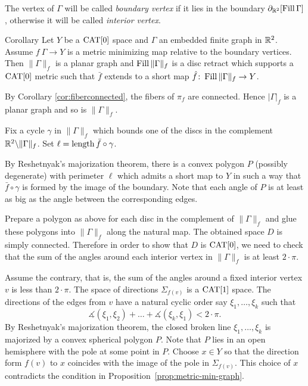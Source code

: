\documentclass{article}
\begin{document}
The vertex of $\Gamma$ will be called \emph{boundary vertex}
if it lies in the boundary $\partial_{\mathbb{R}^2}[\mathop{\rm Fill}\Gamma]$,
otherwise it will be called \emph{interior vertex}.

\begin{thm}{Corollary}\label{cor:planar-minimizing-graph}
Let $Y$ be a $\mathop{\rm CAT}\nolimits[0]$ space and
$\Gamma$ an embedded finite graph in $\mathbb{R}^2$.
Assume $f\:\Gamma\to Y$ is a metric minimizing map relative to the boundary vertices. 
Then $\|\Gamma\|_f$ is a planar graph and
$\mathop{\rm Fill}\|\Gamma\|_f$ is a disc retract which supports a $\mathop{\rm CAT}\nolimits[0]$ metric such that 
 $\bar f$ extends to a short map $\hat f\colon\mathop{\rm Fill}\|\Gamma\|_f\to Y$.
\end{thm}


By Corollary \ref{cor:fiberconnected}, the fibers of $\pi_f$ are connected. Hence $|\Gamma|_f$ is 
a planar graph and so is $\|\Gamma\|_f$.


Fix a cycle $\gamma$ in $\|\Gamma\|_f$ which bounds one of the discs in the complement $\mathbb{R}^2\backslash \|\Gamma\|_f$.
Set $\ell=\mathop{\rm length}\nolimits \bar f\circ\gamma$.

By Reshetnyak's majorization theorem, there is a convex polygon $P$ (possibly degenerate) with perimeter $\ell$ which admits 
a short map to $Y$ in such a way that $\bar f\circ\gamma$ is formed by the image of the boundary.
Note that each angle of $P$ is at least as big as 
the angle between the corresponding edges.

Prepare a polygon as above for each disc in the complement of $\|\Gamma\|_f$
and glue these polygons into $\|\Gamma\|_f$ along the natural map.
The obtained space $D$ is simply connected.
Therefore in order to show that $D$ is $\mathop{\rm CAT}\nolimits[0]$,
we need to check that the sum of the angles around each interior vertex in $\|\Gamma\|_f$ is at least $2\cdot\pi$.


Assume the contrary, that is, 
the sum of the angles around a fixed interior vertex $v$ is less than $2\cdot\pi$.
The space of directions $\Sigma_{f(v)}$ is a $\mathop{\rm CAT}\nolimits[1]$ space.
The directions of the edges from $v$ have a natural
cyclic order say $\xi_1,\dots,\xi_k$
such that
\[\measuredangle(\xi_1,\xi_2)+\dots+\measuredangle(\xi_k,\xi_1)<2\cdot\pi.\]
By Reshetnyak's majorization theorem,
the closed broken line $\xi_1,\dots,\xi_k$ is majorized by a convex spherical polygon $P$.
Note that $P$ lies in an open hemisphere with the pole  at some point in $P$.
Choose $x\in Y$ so that the direction form $f(v)$ to $x$ coincides with the image of the pole in $\Sigma_{f(v)}$.
This choice of $x$ contradicts the condition in Proposition~\ref{prop:metric-min-graph}.
\end{document}
